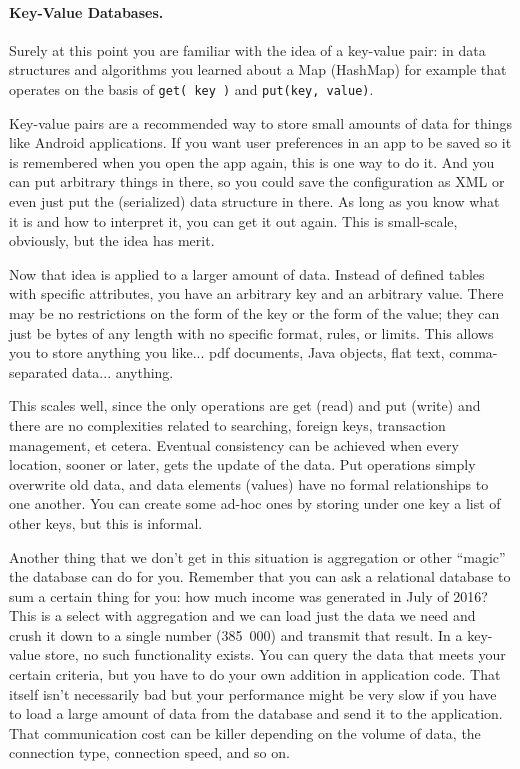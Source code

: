 \documentclass[a4paper]{report}
\begin{document}
\paragraph{Key-Value Databases.} Surely at this point you are familiar with the idea of a key-value pair: in data structures and algorithms you learned about a Map (HashMap) for example that operates on the basis of \texttt{get( key )} and \texttt{put(key, value)}. 

Key-value pairs are a recommended way to store small amounts of data for things like Android applications. If you want user preferences in an app to be saved so it is remembered when you open the app again, this is one way to do it. And you can put arbitrary things in there, so you could save the configuration as XML or even just put the (serialized) data structure in there. As long as you know what it is and how to interpret it, you can get it out again. This is small-scale, obviously, but the idea has merit.

Now that idea is applied to a larger amount of data. Instead of defined tables with specific attributes, you have an arbitrary key and an arbitrary value. There may be no restrictions on the form of the key or the form of the value; they can just be  bytes of any length with no specific format, rules, or limits. This allows you to store anything you like... pdf documents, Java objects, flat text, comma-separated data... anything.

This scales well, since the only operations are get (read) and put (write) and there are no complexities related to searching, foreign keys, transaction management, et cetera. Eventual consistency can be achieved when every location, sooner or later, gets the update of the data. Put operations simply overwrite old data, and data elements (values) have no formal relationships to one another. You can create some ad-hoc ones by storing under one key a list of other keys, but this is informal.

Another thing that we don't get in this situation is aggregation or other ``magic'' the database can do for you. Remember that you can ask a relational database to sum a certain thing for you: how much income was generated in July of 2016? This is a select with aggregation and we can load just the data we need and crush it down to a single number (385~000) and transmit that result. In a key-value store, no such functionality exists. You can query the data that meets your certain criteria, but you have to do your own addition in application code. That itself isn't necessarily bad but your performance might be very slow if you have to load a large amount of data from the database and send it to the application. That communication cost can be killer depending on the volume of data, the connection type, connection speed, and so on.
\end{document}
